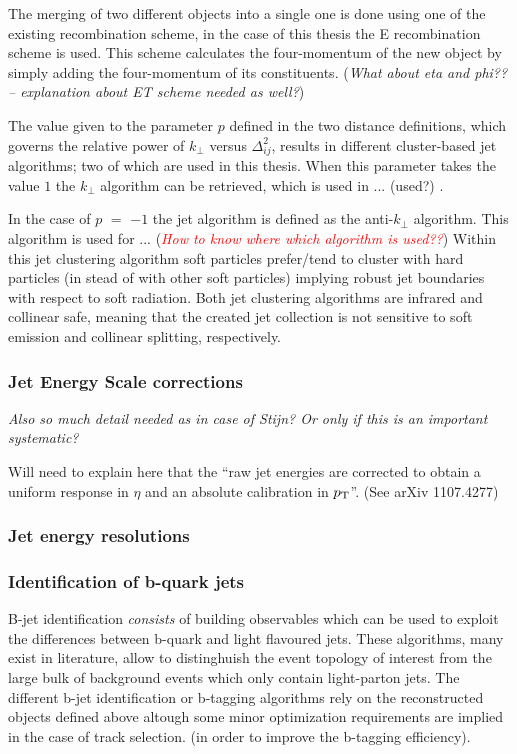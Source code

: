 The merging of two different objects into a single one is done using one of the existing recombination scheme, in the case of this thesis the E recombination scheme is used. This scheme calculates the four-momentum of the new object by simply adding the four-momentum of its constituents. (\textit{What about eta and phi?? -- explanation about ET scheme needed as well?})

The value given to the parameter $p$ defined in the two distance definitions, which governs the relative power of $k_{\bot}$ versus $\Delta_{ij}^{2}$, results in different cluster-based jet algorithms; two of which are used in this thesis. When this parameter takes the value $1$ the $k_{\bot}$ algorithm can be retrieved, which is used in ... (used?) . 

In the case of $p$ $=$ $-1$ the jet algorithm is defined as the anti-$k_{\bot}$ algorithm. This algorithm is used for ... (\textit{\textcolor{red}{How to know where which algorithm is used??}})
Within this jet clustering algorithm soft particles prefer/tend to cluster with hard particles (in stead of with other soft particles) implying robust jet boundaries with respect to soft radiation. Both jet clustering algorithms are infrared and collinear safe, meaning that the created jet collection is not sensitive to soft emission and collinear splitting, respectively.

\subsubsection*{Jet Energy Scale corrections}
\textit{Also so much detail needed as in case of Stijn? Or only if this is an important systematic?}

Will need to explain here that the ``raw jet energies are corrected to obtain a uniform response in $\eta$ and an absolute calibration in $p_{\rm T}$''. (See arXiv 1107.4277)

\subsubsection*{Jet energy resolutions}

\subsubsection*{Identification of b-quark jets}

B-jet identification \textit{consists} of building observables which can be used to exploit the differences between b-quark and light flavoured jets. These algorithms, many exist in literature, allow to distinghuish the event topology of interest from the large bulk of background events which only contain light-parton jets.
The different b-jet identification or b-tagging algorithms rely on the reconstructed objects defined above altough some minor optimization requirements are implied in the case of track selection. (in order to improve the b-tagging efficiency).

